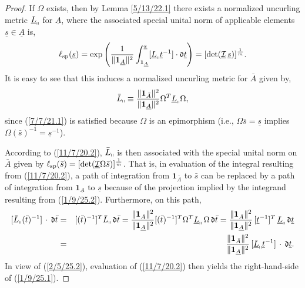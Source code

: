 \documentclass{amsart}
\numberwithin{equation}{section}
\theoremstyle{definition}
\numberwithin{theorem}{section}
\begin{document}
  \begin{proof}  
  If $\Omega$ exists, then by Lemma \ref{5/13/22.1} there exists a normalized uncurling metric $\underline{L}_{\shortparallel}$ for $\underline{A}$, where the associated special unital norm of applicable elements $\underline{s}\in \underline{A}$ is, \begin{equation}\label{1/9/25.1} \ell_{\rm sp}(\underline{s}) =    \exp\left(\frac{1}{\|\mathbf{1}_{\underline{A}}\|^2}\int_{\mathbf{1}_{\underline{A}}}^{\underline{s}} [\underline{L}_{\shortparallel}\underline{t}^{-1}]\cdot \mathfrak{d}\underline{t}\right) = [\text{det}(\underline{\mathcal{I}}\, \underline{s})]^\frac{1}{m}.\end{equation}  It is easy to see that this induces a normalized uncurling metric for $\bar{A}$ given by, 
  \begin{equation}\label{1/9/25.2} \bar{L}_{\shortparallel} \equiv \frac{\|\mathbf{1}_{\bar{A}}\|^2}{\|\mathbf{1}_{\underline{A}}\|^2} \Omega^T \underline{L}_{\shortparallel} \Omega, \end{equation} since (\ref{7/7/21.1}) is satisfied because $\Omega$ is an epimorphism (i.e., $\Omega\bar{s} =  \underline{s}$ implies \mbox{$\Omega(\bar{s})^{-1} =  \underline{s}^{-1}$)}.
  
  According to (\ref{11/7/20.2}), $\bar{L}_{\shortparallel}$ is then associated with the special unital norm on $\bar{A}$ given by $\ell_{\rm sp}(\bar{s}) = [\text{det}(\underline{\mathcal{I}}\Omega\bar{s})]^{\frac{1}{m}}$.  That is, in evaluation of the integral resulting from  (\ref{11/7/20.2}), a path of integration from $\mathbf{1}_{\bar{A}}$ to $\bar{s}$ can be replaced by a path of integration from $\mathbf{1}_{\underline{A}}$ to $\underline{s}$ because of the projection implied by the integrand resulting from (\ref{1/9/25.2}).   Furthermore, on this path,
  \begin{eqnarray}\nonumber  [\bar{L}_{\shortparallel}(\bar{t})^{-1}]\,\cdot\, \mathfrak{d}\bar{t} &=& [(\bar{t})^{-1}]^T \bar{L}_{\shortparallel}\,\mathfrak{d}\bar{t} =  \frac{\|\mathbf{1}_{\bar{A}}\|^2}{\|\mathbf{1}_{\underline{A}}\|^2}[(\bar{t})^{-1}]^T \Omega^T \underline{L}_{\shortparallel} \, \Omega \, \mathfrak{d}\bar{t}  = \frac{\|\mathbf{1}_{\bar{A}}\|^2}{\|\mathbf{1}_{\underline{A}}\|^2}\,[\underline{t}^{-1}]^T\, \underline{L}_{\shortparallel}\,\mathfrak{d}\underline{t} \\ &=& \frac{\|\mathbf{1}_{\bar{A}}\|^2}{\|\mathbf{1}_{\underline{A}}\|^2}\,[\underline{L}_{\shortparallel}\underline{t}^{-1}]\,\cdot\, \mathfrak{d}\underline{t}.\label{2/5/25.2}\end{eqnarray}   In view of (\ref{2/5/25.2}), evaluation of (\ref{11/7/20.2}) then yields the right-hand-side of (\ref{1/9/25.1}). 
  


\end{proof}
\end{document}
